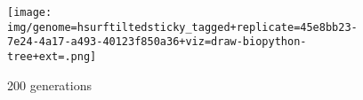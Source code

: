 \begin{figure*}
  \centering
  \texttt{[image: img/genome=hsurftiltedsticky\_tagged+replicate=45e8bb23-7e24-4a17-a493-40123f850a36+viz=draw-biopython-tree+ext=.png]}
  \caption{200 generations}
\end{figure*}
